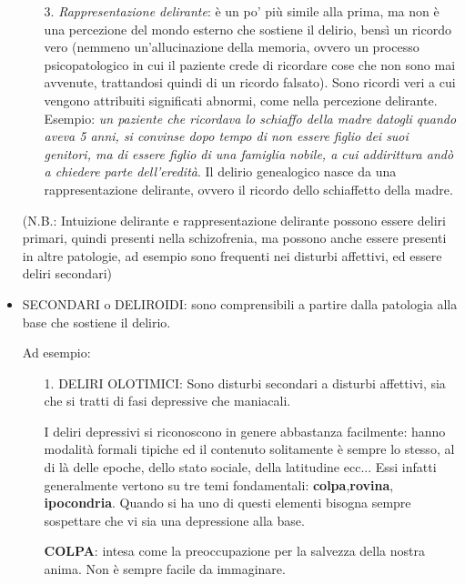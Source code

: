 \begin{itemize}
\begin{itemize}
\item[3.]
  \emph{Rappresentazione delirante}: è un po' più simile alla prima, ma
  non è una percezione del mondo esterno che sostiene il delirio, bensì
  un ricordo vero (nemmeno un'allucinazione della memoria, ovvero un
  processo psicopatologico in cui il paziente crede di ricordare cose
  che non sono mai avvenute, trattandosi quindi di un ricordo falsato).
  Sono ricordi veri a cui vengono attribuiti significati abnormi, come
  nella percezione delirante. Esempio: \emph{un paziente che ricordava
  lo schiaffo della madre datogli quando aveva 5 anni, si convinse dopo
  tempo di non essere figlio dei suoi genitori, ma di essere figlio di
  una famiglia nobile, a cui addirittura andò a chiedere parte
  dell'eredità}. Il delirio genealogico nasce da una rappresentazione
  delirante, ovvero il ricordo dello schiaffetto della madre.
\end{itemize}

(N.B.: Intuizione delirante e rappresentazione delirante possono essere
deliri primari, quindi presenti nella schizofrenia, ma possono anche
essere presenti in altre patologie, ad esempio sono frequenti nei
disturbi affettivi, ed essere deliri secondari)

\item
  SECONDARI o DELIROIDI: sono comprensibili a partire dalla patologia
  alla base che sostiene il delirio.

Ad esempio:

\begin{itemize}
\item[1.]
  DELIRI OLOTIMICI: Sono disturbi secondari a disturbi affettivi, sia
  che si tratti di fasi depressive che maniacali.

  I deliri depressivi si riconoscono in genere abbastanza facilmente:
  hanno modalità formali tipiche ed il contenuto solitamente è sempre lo
  stesso, al di là delle epoche, dello stato sociale, della latitudine
  ecc... Essi infatti generalmente vertono su tre temi fondamentali:
  \textbf{colpa},\textbf{rovina}, \textbf{ipocondria}. Quando si ha uno
  di questi elementi bisogna sempre sospettare che vi sia una
  depressione alla base.

  \textbf{COLPA}: intesa come la preoccupazione per la salvezza della
  nostra anima. Non è sempre facile da immaginare.


\end{itemize}
\end{itemize}
